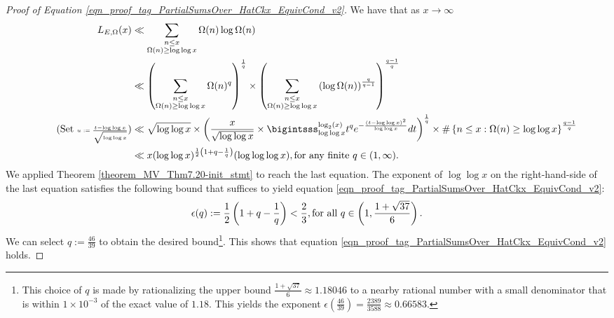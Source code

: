 \documentclass[11pt,reqno,a4letter]{article}
\newcommand{\hlocalref}[1]{\hyperref[#1]{\ref{#1}}}
\numberwithin{equation}{section}
\numberwithin{figure}{section}
\numberwithin{table}{section}
\theoremstyle{plain}
\numberwithin{theorem}{section}
\theoremstyle{definition}
\theoremstyle{remark}
\newcommand{\mathtext}[1]{\text{\rm #1}}
\begin{document}
\begin{proof}[Proof of Equation \eqref{eqn_proof_tag_PartialSumsOver_HatCkx_EquivCond_v2}]
We have that as $x \rightarrow \infty$ 
\begin{align*}
L_{E,\Omega}(x) & \ll \sum_{\substack{n \leq x \\ \Omega(n) \geq \log\log x}} 
	\Omega(n) \log \Omega(n) \\ 
	& \ll \left(\sum_{\substack{n \leq x \\ \Omega(n) \geq \log\log x}} 
	\Omega(n)^q\right)^{\frac{1}{q}} \times 
	\left(\sum_{\substack{n \leq x \\ \Omega(n) \geq \log\log x}} 
     \left(\log \Omega(n)\right)^{\frac{q}{q-1}}\right)^{\frac{q-1}{q}} \\ 
\tag{Set {\tiny$u := \frac{t-\log\log x}{\sqrt{\log\log x}}$}}
	& \ll \sqrt{\log\log x} \times 
	\left(\frac{x}{\sqrt{\log\log x}} \times \bigintsss_{\log\log x}^{\log_2(x)} t^q 
	e^{-\frac{\left(t-\log\log x\right)^2}{\log\log x}} dt\right)^{\frac{1}{q}} \times 
	\#\left\{n \leq x: \Omega(n) \geq \log\log x\right\}^{\frac{q-1}{q}} \\ 
     & \ll x (\log\log x)^{\frac{1}{2}\left(1 + q - \frac{1}{q}\right)} (\log\log\log x), 
     \mathtext{ for any finite } q \in (1, \infty).
\end{align*} 
We applied Theorem \hlocalref{theorem_MV_Thm7.20-init_stmt} to reach the last equation. 
The exponent of $\log\log x$ on the right-hand-side of the 
last equation satisfies the following bound that suffices to 
yield equation \eqref{eqn_proof_tag_PartialSumsOver_HatCkx_EquivCond_v2}: 
\[
\epsilon(q) := \frac{1}{2}\left(1 + q - \frac{1}{q}\right) < \frac{2}{3},
     \mathtext{ for all } q \in \left(1, \frac{1 + \sqrt{37}}{6}\right). 
\]
We can select $q := \frac{46}{39}$ to obtain the desired bound\footnote{
     This choice of $q$ is made by rationalizing the upper bound 
     $\frac{1 + \sqrt{37}}{6} \approx 1.18046$ to a nearby rational number with a 
     small denominator that is within $1 \times 10^{-3}$ of the exact value of $1.18$. 
     This yields the exponent 
     $\epsilon\left(\frac{46}{39}\right) = \frac{2389}{3588} \approx 0.66583$. 
}. 
This shows that equation \eqref{eqn_proof_tag_PartialSumsOver_HatCkx_EquivCond_v2} holds. 
\end{proof} 
\end{document}
